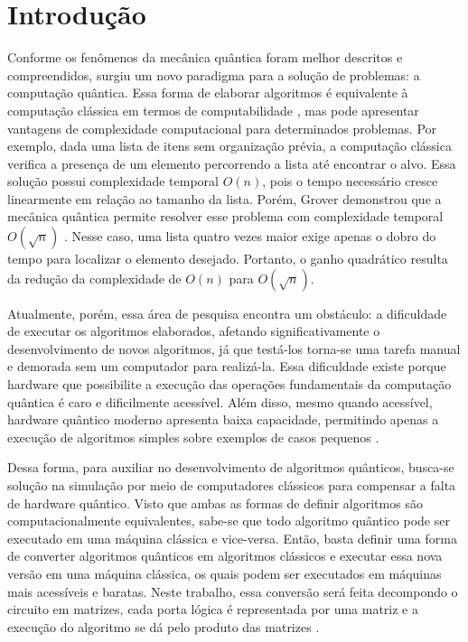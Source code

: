 \chapter{Introdução}\label{chap:intro}

Conforme os fenômenos da mecânica quântica foram melhor descritos e compreendidos, surgiu um novo paradigma para a solução de problemas: a computação quântica. Essa forma de elaborar algoritmos é equivalente à computação clássica em termos de computabilidade \cite{shor1998quantum}, mas pode apresentar vantagens de complexidade computacional para determinados problemas. Por exemplo, dada uma lista de itens sem organização prévia, a computação clássica verifica a presença de um elemento percorrendo a lista até encontrar o alvo. Essa solução possui complexidade temporal $O(n)$, pois o tempo necessário cresce linearmente em relação ao tamanho da lista. Porém, Grover demonstrou que a mecânica quântica permite resolver esse problema com complexidade temporal $O(\sqrt{n})$ \cite{grover}. Nesse caso, uma lista quatro vezes maior exige apenas o dobro do tempo para localizar o elemento desejado. Portanto, o ganho quadrático resulta da redução da complexidade de $O(n)$ para $O(\sqrt{n})$.

Atualmente, porém, essa área de pesquisa encontra um obstáculo: a dificuldade de executar os algoritmos elaborados, afetando significativamente o desenvolvimento de novos algoritmos, já que testá-los torna-se uma tarefa manual e demorada sem um computador para realizá-la. Essa dificuldade existe porque hardware que possibilite a execução das operações fundamentais da computação quântica é caro e dificilmente acessível. Além disso, mesmo quando acessível, hardware quântico moderno apresenta baixa capacidade, permitindo apenas a execução de algoritmos simples sobre exemplos de casos pequenos \cite{golec2024quantum}.

Dessa forma, para auxiliar no desenvolvimento de algoritmos quânticos, busca-se solução na simulação por meio de computadores clássicos para compensar a falta de hardware quântico. Visto que ambas as formas de definir algoritmos são computacionalmente equivalentes, sabe-se que todo algoritmo quântico pode ser executado em uma máquina clássica e vice-versa. Então, basta definir uma forma de converter algoritmos quânticos em algoritmos clássicos e executar essa nova versão em uma máquina clássica, os quais podem ser executados em máquinas mais acessíveis e baratas. Neste trabalho, essa conversão será feita decompondo o circuito em matrizes, cada porta lógica é representada por uma matriz e a execução do algoritmo se dá pelo produto das matrizes \cite{nielsen2010quantum}.

